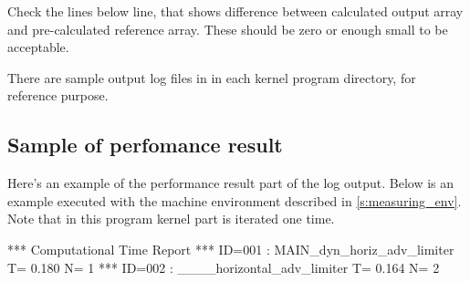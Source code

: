 Check the lines below  line,
that shows difference between calculated output array and
pre-calculated reference array.
These should be zero or enough small to be acceptable.

There are sample output log files in 
in each kernel program directory, for reference purpose.

\subsection{Sample of perfomance result}

Here's an example of the performance result part of the log output.
Below is an example executed with the machine environment described in \autoref{s:measuring_env}.
%
Note that in this program kernel part is iterated one time.

\begin{LstLog}
 *** Computational Time Report
 *** ID=001 : MAIN_dyn_horiz_adv_limiter       T=     0.180 N=      1
 *** ID=002 : ____horizontal_adv_limiter       T=     0.164 N=      2
\end{LstLog}
